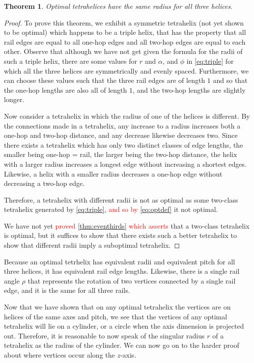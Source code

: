 \documentclass[twocolumn,10pt]{asme2ej}
\newtheorem{theorem}{Theorem}
\newcommand{\highlighttext}[1] {\textcolor{red}{#1}}
\begin{document}
\begin{theorem}
  Optimal tetrahelices have the same radius for all three helices.
\end{theorem}
\begin{proof}
To prove this theorem, we exhibit a symmetric tetrahelix (not yet shown to be optimal) which
happens to be a triple helix, that has
the property that all rail edges are equal to all one-hop edges and all two-hop
edges are equal to each other. 
Observe that although we have not get given the formula for the
radii of such a triple helix, there are some values for $r$ and $\alpha$, and $\phi$
in \cref{eq:triple}
for which all the three helices are symmetrically and evenly spaced. Furthermore,
we can choose these values such that the three rail edges are of length $1$ and
so that the one-hop lengths are also all of length $1$, and the two-hop lengths
are slightly longer.

Now consider a tetrahelix in which the radius of one of the helices is different.
By the connections made in a tetrahelix, any increase to a radius increases both
a one-hop and two-hop distance, and any decrease likewise decreases two.
Since there exists a tetrahelix which has only two distinct classes of edge lengths,
the smaller being one-hop = rail, the larger being the two-hop distance, the helix
with a larger radius increases a longest edge without increasing a shortest edges.
Likewise, a helix with a smaller radius decreases a one-hop edge without decreasing
a two-hop edge.

Therefore, a tetrahelix with different radii is not as optimal as some two-class 
tetrahelix generated by \cref{eq:triple}, \highlighttext{ and so by \cref{eq:optdef}} it not optimal.

We have not yet
\highlighttext{proved \cref{thm:eventhirds} which asserts} that a two-class tetrahelix is optimal, but it suffices to show that there
exists such a better tetrahelix to show that different radii imply a suboptimal
tetrahelix.
\end{proof}

Because an optimal tetrhelix has equivalent radii and equivalent pitch for all three helices,
it has equivalent rail edge lengths. Likewise, there is a single rail angle $\rho$ that
represents the rotation of two vertices connected by a single rail edge, and it is the same
for all three rails.

Now that we have shown that on any optimal tetrahelix the vertices
are on helices of the same axes and pitch, we see that the vertices 
of any optimal tetrahelix will lie on a cylinder, or a circle when the axis dimension
is projected out. Therefore, it is reasonable to now speak of the singular radius $r$
of a tetrahelix as the radius of the cylinder.
We can now go on to
the harder proof about where vertices occur along the $z$-axis.
\end{document}
